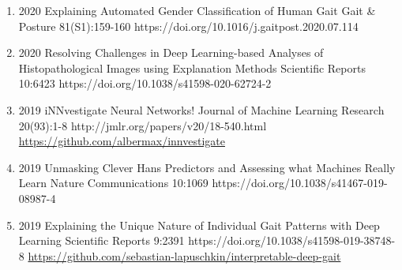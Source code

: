 \documentclass[10pt,a4paper]{article} %
\begin{document}
{\begin{enumerate}
    \item {}
                        {2020}
                        {Explaining Automated Gender Classification of Human Gait}
                        {Gait \& Posture}
                        {81(S1):159-160}
                        {https://doi.org/10.1016/j.gaitpost.2020.07.114}

    \item {}
                        {2020}
                        {Resolving Challenges in Deep Learning-based Analyses of Histopathological Images using Explanation Methods}
                        {Scientific Reports}
                        {10:6423}
                        {https://doi.org/10.1038/s41598-020-62724-2}

    \item {}
                        {2019}
                        {iNNvestigate Neural Networks!}
                        {Journal of Machine Learning Research}
                        {20(93):1-8}
                        {http://jmlr.org/papers/v20/18-540.html}
                        {\href{https://github.com/albermax/innvestigate}{https://github.com/albermax/innvestigate}}

    \item {}
                        {2019}
                        {Unmasking Clever Hans Predictors and Assessing what Machines Really Learn}
                        {Nature Communications}
                        {10:1069}
                        {https://doi.org/10.1038/s41467-019-08987-4}

    \item {}
                        {2019}
                        {Explaining the Unique Nature of Individual Gait Patterns with Deep Learning}
                        {Scientific Reports}
                        {9:2391}
                        {https://doi.org/10.1038/s41598-019-38748-8}
                        {\href{https://github.com/sebastian-lapuschkin/interpretable-deep-gait}{https://github.com/sebastian-lapuschkin/interpretable-deep-gait}}


\end{enumerate}}
\end{document}
